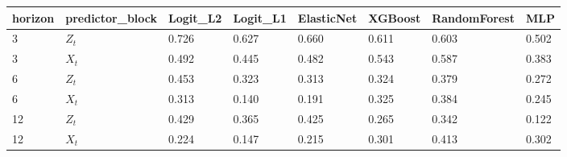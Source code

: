 \begin{tabular}{llllllll}
\toprule
horizon & predictor_block & Logit_L2 & Logit_L1 & ElasticNet & XGBoost & RandomForest & MLP \\
\midrule
3 & $Z_t$ & 0.726 & 0.627 & 0.660 & 0.611 & 0.603 & 0.502 \\
3 & $X_t$ & 0.492 & 0.445 & 0.482 & 0.543 & 0.587 & 0.383 \\
6 & $Z_t$ & 0.453 & 0.323 & 0.313 & 0.324 & 0.379 & 0.272 \\
6 & $X_t$ & 0.313 & 0.140 & 0.191 & 0.325 & 0.384 & 0.245 \\
12 & $Z_t$ & 0.429 & 0.365 & 0.425 & 0.265 & 0.342 & 0.122 \\
12 & $X_t$ & 0.224 & 0.147 & 0.215 & 0.301 & 0.413 & 0.302 \\
\bottomrule
\end{tabular}
